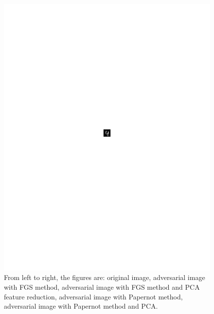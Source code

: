 \begin{figure}
\begin{minipage}{.09\textwidth}
\end{minipage}
\begin{minipage}{.09\textwidth}
	\centering
    \includegraphics[width =0.9\linewidth, trim = 300 400 300 375, clip]{figs/papernot9pca.pdf}
\end{minipage}
\caption{From left to right, the figures are: original image, adversarial image with FGS method, adversarial image with FGS method and PCA feature reduction, adversarial image with Papernot method, adversarial image with Papernot method and PCA.}\label{fig:picof9s}
\end{figure}